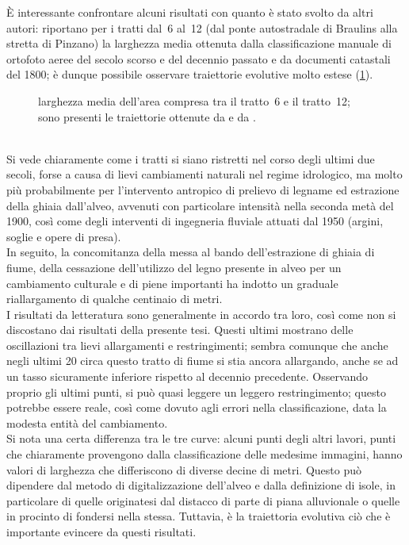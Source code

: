 È interessante confrontare alcuni risultati con quanto è stato svolto da altri autori:  riportano per i tratti dal~6 al~12 (dal ponte autostradale di Braulins alla stretta di Pinzano) la larghezza media ottenuta dalla classificazione manuale di ortofoto aeree del secolo scorso e del decennio passato e da documenti catastali del 1800; è dunque possibile osservare traiettorie evolutive molto estese (\cref{graph:larghezze-vs-letteratura}).
%
\begin{figure}
	\centering
	
	\caption[larghezza media dell'area compresa tra il tratto~6 e il tratto~12]{larghezza media dell'area compresa tra il tratto~6 e il tratto~12; sono presenti le traiettorie ottenute da  e da .}
	\label{graph:larghezze-vs-letteratura}
\end{figure}
%
\\
Si vede chiaramente come i tratti si siano ristretti nel corso degli ultimi due secoli, forse a causa di lievi cambiamenti naturali nel regime idrologico, ma molto più probabilmente per l'intervento antropico di prelievo di legname ed estrazione della ghiaia dall'alveo, avvenuti con particolare intensità nella seconda metà del 1900, così come degli interventi di ingegneria fluviale attuati dal 1950 (argini, soglie e opere di presa).
\\
In seguito, la concomitanza della messa al bando dell'estrazione di ghiaia di fiume, della cessazione dell'utilizzo del legno presente in alveo per un cambiamento culturale e di piene importanti ha indotto un graduale riallargamento di qualche centinaio di metri.
\\
I risultati da letteratura sono generalmente in accordo tra loro, così come non si discostano dai risultati della presente tesi.
Questi ultimi mostrano delle oscillazioni tra lievi allargamenti e restringimenti; sembra comunque che anche negli ultimi \SI{20}{\anni} circa questo tratto di fiume si stia ancora allargando, anche se ad un tasso sicuramente inferiore rispetto al decennio precedente.
Osservando proprio gli ultimi punti, si può quasi leggere un leggero restringimento; questo potrebbe essere reale, così come dovuto agli errori nella classificazione, data la modesta entità del cambiamento.
\\
Si nota una certa differenza tra le tre curve: alcuni punti degli altri lavori, punti che chiaramente provengono dalla classificazione delle medesime immagini, hanno valori di larghezza che differiscono di diverse decine di metri.
Questo può dipendere dal metodo di digitalizzazione dell'alveo e dalla definizione di isole, in particolare di quelle originatesi dal distacco di parte di piana alluvionale o quelle in procinto di fondersi nella stessa.
Tuttavia, è la traiettoria evolutiva ciò che è importante evincere da questi risultati.
